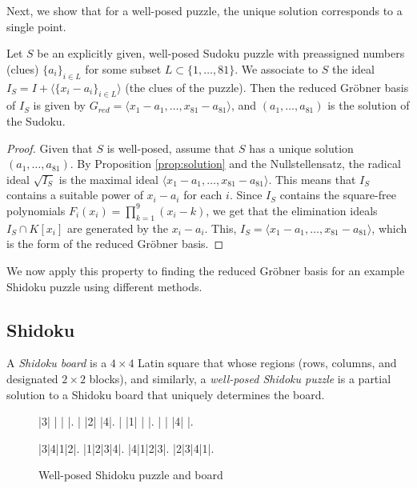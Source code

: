 \documentclass[../main.tex]{subfiles}
\begin{document}
        Next, we show that for a well-posed puzzle, the unique solution corresponds to a single point. 
        \begin{proposition} \label{prop:unique}
            Let $S$ be an explicitly given, well-posed Sudoku puzzle with preassigned numbers (clues) $\{a_i\}_{i\in L}$ for some subset $L\subset \{1,\dots,81\}$. We associate to $S$ the ideal $I_S=I+\langle\{x_i-a_i\}_{i\in L}\rangle$ (the clues of the puzzle). Then the reduced Gr\"obner basis of $I_S$ is given by $G_{red}=\langle x_1-a_1,\dots,x_{81}-a_{81}\rangle$, and $(a_1,\dots,a_{81})$ is the solution of the Sudoku.
        \end{proposition}
        \begin{proof}
            Given that $S$ is well-posed, assume that $S$ has a unique solution $(a_1,\dots,a_{81})$. By Proposition \ref{prop:solution} and the Nullstellensatz, the radical ideal $\sqrt{I_S}$ is the maximal ideal $\langle x_1-a_1,\dots,x_{81}-a_{81}\rangle$. This means that $I_S$ contains a suitable power of $x_i-a_i$ for each $i$. Since $I_S$ contains the square-free polynomials $F_i(x_i)=\prod^9_{k=1}(x_i-k)$, we get that the elimination ideals $I_S\cap K[x_i]$ are generated by the $x_i-a_i$. This, $I_S=\langle x_1-a_1,\dots,x_{81}-a_{81}\rangle$, which is the form of the reduced Gr\"obner basis.
        \end{proof}

        We now apply this property to finding the reduced Gr\"obner basis for an example Shidoku puzzle using different methods.

    \subsection{Shidoku}

            A \emph{Shidoku board} is a $4\times 4$ Latin square that whose regions (rows, columns, and designated $2\times 2$ blocks), and similarly, a \emph{well-posed Shidoku puzzle} is a partial solution to a Shidoku board that uniquely determines the board.

            \begin{figure}[h!]
                \label{fig:shidoku}
                \centering
                \begin{shidoku-block}
                    |3| | | |.
                    | |2| |4|.
                    | |1| | |.
                    | | |4| |.
                \end{shidoku-block}
                \hspace*{10pt}
                \begin{shidoku-block}
                    |3|4|1|2|.
                    |1|2|3|4|.
                    |4|1|2|3|.
                    |2|3|4|1|.
                \end{shidoku-block}
                \caption{Well-posed Shidoku puzzle and board}
            \end{figure}
\end{document}

